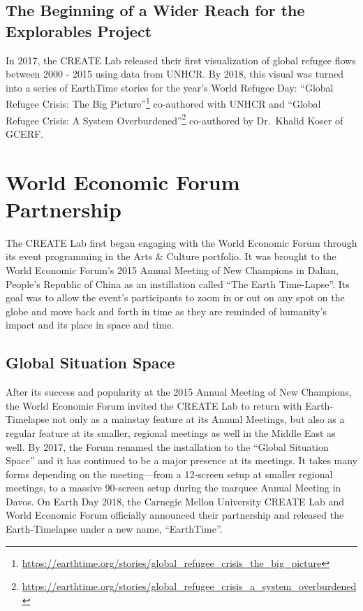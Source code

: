 \documentclass[
]{book}
\renewcommand{\href}[2]{#2\footnote{\url{#1}}}
\begin{document}
\hypertarget{the-beginning-of-a-wider-reach-for-the-explorables-project}{%
\subsection*{The Beginning of a Wider Reach for the Explorables Project}\label{the-beginning-of-a-wider-reach-for-the-explorables-project}}


In 2017, the CREATE Lab released their first visualization of global refugee flows between 2000 - 2015 using data from UNHCR. By 2018, this visual was turned into a series of EarthTime stories for the year's World Refugee Day: \href{https://earthtime.org/stories/global_refugee_crisis_the_big_picture}{``Global Refugee Crisis: The Big Picture''} co-authored with UNHCR and \href{https://earthtime.org/stories/global_refugee_crisis_a_system_overburdened}{``Global Refugee Crisis: A System Overburdened''} co-authored by Dr.~Khalid Koser of GCERF.

\hypertarget{world-economic-forum-partnership}{%
\section{World Economic Forum Partnership}\label{world-economic-forum-partnership}}

The CREATE Lab first began engaging with the World Economic Forum through its event programming in the Arts \& Culture portfolio. It was brought to the World Economic Forum's 2015 Annual Meeting of New Champions in Dalian, People's Republic of China as an instillation called ``The Earth Time-Lapse''. Its goal was to allow the event's participants to zoom in or out on any spot on the globe and move back and forth in time as they are reminded of humanity's impact and its place in space and time.

\hypertarget{global-situation-space}{%
\subsection*{Global Situation Space}\label{global-situation-space}}


After its success and popularity at the 2015 Annual Meeting of New Champions, the World Economic Forum invited the CREATE Lab to return with Earth-Timelapse not only as a mainstay feature at its Annual Meetings, but also as a regular feature at its smaller, regional meetings as well in the Middle East as well. By 2017, the Forum renamed the installation to the ``Global Situation Space'' and it has continued to be a major presence at its meetings. It takes many forms depending on the meeting---from a 12-screen setup at smaller regional meetings, to a massive 90-screen setup during the marquee Annual Meeting in Davos. On Earth Day 2018, the Carnegie Mellon University CREATE Lab and World Economic Forum officially announced their partnership and released the Earth-Timelapse under a new name, ``EarthTime''.
\end{document}
